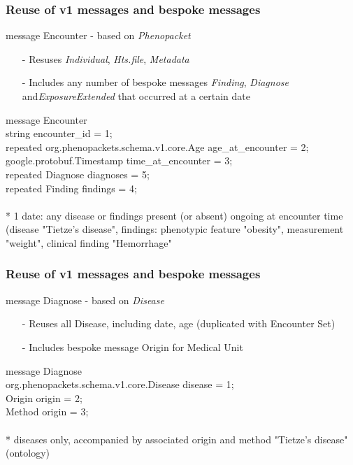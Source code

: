 \documentclass{beamer}
\begin{document}

\begin{frame}
\frametitle{Reuse of v1 messages and bespoke messages}
\begin{block}{message Encounter - based on \textit{Phenopacket}}
\begin{itemize}
\item[-] Resuses \textit{Individual}, \textit{Hts.file}, \textit{Metadata}   
\item[-] Includes any number of bespoke messages \textit{Finding}, \textit{Diagnose} and\textit{ExposureExtended} that occurred at a certain date
\end{itemize}
\end{block}

message \colorbox{yellow!80}{Encounter} \ { \\ 
    string encounter\_id = 1; \\
    repeated org.phenopackets.schema.v1.core.Age age\_at\_encounter = 2; \\
    google.protobuf.Timestamp time\_at\_encounter = 3; \\
    repeated \colorbox{yellow!80}{Diagnose} diagnoses = 5; \\
        repeated \colorbox{yellow!80}{Finding} findings = 4; \\
\ } \\

{\color{blue}* 1 date: any disease or findings present (or absent) ongoing at encounter time (disease "Tietze's disease", findings: phenotypic feature "obesity", measurement "weight", clinical finding "Hemorrhage"} 

\end{frame}


\begin{frame}
\frametitle{Reuse of v1 messages and bespoke messages}
\begin{block}{message Diagnose - based on \textit{Disease}}
\begin{itemize}
\item[-] Reuses all Disease, including date, age (duplicated with Encounter Set)
\item[-] Includes bespoke message Origin for Medical Unit 
\end{itemize}
\end{block}
message \colorbox{yellow!80}{Diagnose} \ { \\   
    org.phenopackets.schema.v1.core.Disease disease = 1; \\
    \colorbox{yellow!80}{Origin} origin = 2;\\
      \colorbox{yellow!80}{Method} origin = 3; \\
\ } \\

{\color{blue}* diseases only, accompanied by associated origin and method "Tietze's disease" (ontology)} 


\end{frame}
\end{document}
